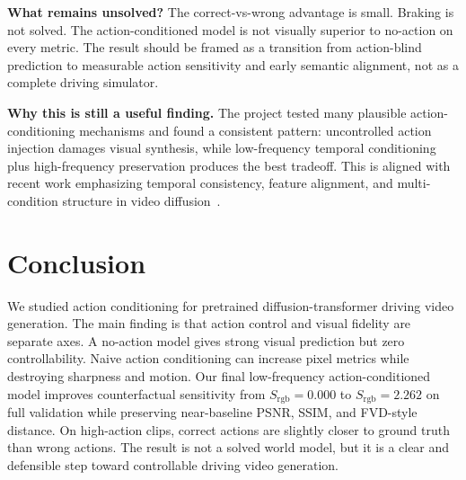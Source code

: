 \documentclass[10pt,twocolumn,letterpaper]{article}
\newcommand{\srgb}{S_{\mathrm{rgb}}}
\begin{document}
\textbf{What remains unsolved?}
The correct-vs-wrong advantage is small. Braking is not solved. The action-conditioned model is not visually superior to no-action on every metric. The result should be framed as a transition from action-blind prediction to measurable action sensitivity and early semantic alignment, not as a complete driving simulator.

\textbf{Why this is still a useful finding.}
The project tested many plausible action-conditioning mechanisms and found a consistent pattern: uncontrolled action injection damages visual synthesis, while low-frequency temporal conditioning plus high-frequency preservation produces the best tradeoff. This is aligned with recent work emphasizing temporal consistency, feature alignment, and multi-condition structure in video diffusion~\cite{luo2025enhanceavideo,lee2025align4gen,yi2025conditionalcompression}.

\section{Conclusion}

We studied action conditioning for pretrained diffusion-transformer driving video generation. The main finding is that action control and visual fidelity are separate axes. A no-action model gives strong visual prediction but zero controllability. Naive action conditioning can increase pixel metrics while destroying sharpness and motion. Our final low-frequency action-conditioned model improves counterfactual sensitivity from $\srgb=0.000$ to $\srgb=2.262$ on full validation while preserving near-baseline PSNR, SSIM, and FVD-style distance. On high-action clips, correct actions are slightly closer to ground truth than wrong actions. The result is not a solved world model, but it is a clear and defensible step toward controllable driving video generation.

{\small


}
\end{document}

